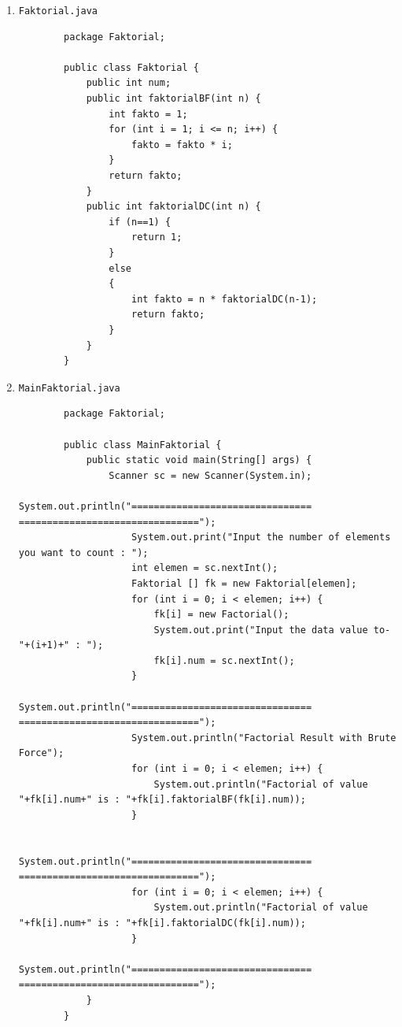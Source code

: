 \documentclass[12pt,titlepage]{article}
\begin{document}
\begin{enumerate}
    \item \texttt{Faktorial.java}
    \begin{verbatim}
        package Faktorial;

        public class Faktorial {
            public int num;
            public int faktorialBF(int n) {
                int fakto = 1;
                for (int i = 1; i <= n; i++) {
                    fakto = fakto * i;
                }
                return fakto;
            }
            public int faktorialDC(int n) {
                if (n==1) {
                    return 1;
                }
                else
                {
                    int fakto = n * faktorialDC(n-1);
                    return fakto;
                }
            }
        }
    \end{verbatim}
    \item \texttt{MainFaktorial.java}
    \begin{verbatim}
        package Faktorial;

        public class MainFaktorial {
            public static void main(String[] args) {
                Scanner sc = new Scanner(System.in);
                    System.out.println("================================ ================================");
                    System.out.print("Input the number of elements you want to count : ");
                    int elemen = sc.nextInt();
                    Faktorial [] fk = new Faktorial[elemen];
                    for (int i = 0; i < elemen; i++) {
                        fk[i] = new Factorial();
                        System.out.print("Input the data value to-"+(i+1)+" : ");
                        fk[i].num = sc.nextInt();
                    }
                    System.out.println("================================ ================================");
                    System.out.println("Factorial Result with Brute Force");
                    for (int i = 0; i < elemen; i++) {
                        System.out.println("Factorial of value "+fk[i].num+" is : "+fk[i].faktorialBF(fk[i].num));
                    }
                    
                    System.out.println("================================ ================================");
                    for (int i = 0; i < elemen; i++) {
                        System.out.println("Factorial of value "+fk[i].num+" is : "+fk[i].faktorialDC(fk[i].num));
                    }
                    System.out.println("================================ ================================");
            }
        }
    \end{verbatim}
\end{enumerate}
\end{document}
